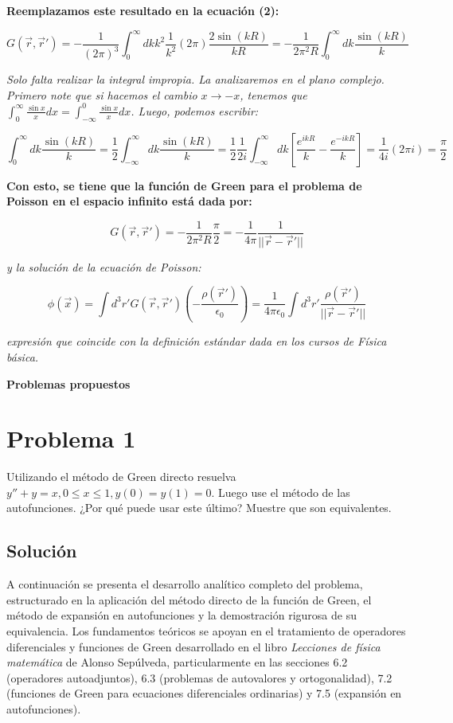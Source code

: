 \documentclass[a4paper]{article}
\begin{document}
\textbf{Reemplazamos este resultado en la ecuación (2):}

$$ G(\vec{r}, \vec{r}') = -\frac{1}{(2\pi)^3} \int_0^\infty dk k^2 \frac{1}{k^2} (2\pi) \frac{2 \sin(kR)}{kR} = -\frac{1}{2\pi^2 R} \int_0^\infty dk \frac{\sin(kR)}{k} $$

\textit{Solo falta realizar la integral impropia. La analizaremos en el plano complejo. Primero note que si hacemos el cambio $x \to -x$, tenemos que $\int_0^\infty \frac{\sin x}{x} dx = \int_{-\infty}^0 \frac{\sin x}{x} dx$. Luego, podemos escribir:}

$$ \int_0^\infty dk \frac{\sin(kR)}{k} = \frac{1}{2} \int_{-\infty}^\infty dk \frac{\sin(kR)}{k} = \frac{1}{2} \frac{1}{2i} \int_{-\infty}^\infty dk \left[ \frac{e^{ikR}}{k} - \frac{e^{-ikR}}{k} \right] = \frac{1}{4i} (2\pi i) = \frac{\pi}{2} $$

\textbf{Con esto, se tiene que la función de Green para el problema de Poisson en el espacio infinito está dada por:}

$$ G(\vec{r}, \vec{r}') = -\frac{1}{2\pi^2 R} \frac{\pi}{2} = -\frac{1}{4\pi} \frac{1}{||\vec{r} - \vec{r}'||} $$

\textit{y la solución de la ecuación de Poisson:}

$$ \phi(\vec{x}) = \int d^3r' G(\vec{r}, \vec{r}') \left( -\frac{\rho(\vec{r}')}{\epsilon_0} \right) = \frac{1}{4\pi\epsilon_0} \int d^3r' \frac{\rho(\vec{r}')}{||\vec{r} - \vec{r}'||} $$

\textit{expresión que coincide con la definición estándar dada en los cursos de Física básica.}


\textbf{Problemas propuestos}

\section{Problema 1} 
Utilizando el método de Green directo resuelva $y'' + y = x, 0 \le x \le 1, y(0) = y(1) = 0$. Luego use el método de las autofunciones. ¿Por qué puede usar este último? Muestre que son equivalentes.


\subsection{Solución}

A continuación se presenta el desarrollo analítico completo del problema, estructurado en la aplicación del método directo de la función de Green, el método de expansión en autofunciones y la demostración rigurosa de su equivalencia. Los fundamentos teóricos se apoyan en el tratamiento de operadores diferenciales y funciones de Green desarrollado en el libro \textit{Lecciones de física matemática} de Alonso Sepúlveda, particularmente en las secciones 6.2 (operadores autoadjuntos), 6.3 (problemas de autovalores y ortogonalidad), 7.2 (funciones de Green para ecuaciones diferenciales ordinarias) y 7.5 (expansión en autofunciones).
\end{document}
